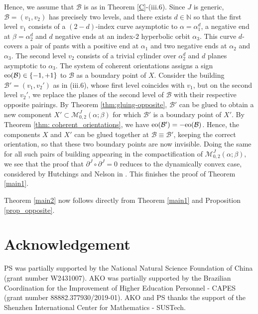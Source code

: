 \documentclass{amsart}
\newcommand{\N}{\mathbb{N}}
\begin{document}
Hence, we assume that $\mathcal B$ is as in Theorem \ref{C}-(iii.6). Since $J$ is generic, $\mathcal B=(v_1,v_2)$ has precisely two levels, and there exists $d\in \N$ so that the first level $v_1$ consists of a $(2-d)$-index curve asymptotic to $\alpha=\alpha_1^d$, a negative end at $\beta=\alpha_2^d$ and $d$ negative ends at an index-$2$ hyperbolic orbit $\alpha_3$. This curve $d$-covers a pair of pants with a positive end at $\alpha_1$ and two negative ends at $\alpha_2$ and $\alpha_3$. The second level $v_2$ consists of a trivial cylinder over $\alpha_2^d$ and $d$ planes asymptotic to $\alpha_3$. The system of coherent orientations assigns a sign ${\rm eo}(\mathcal B) \in \{-1,+1\}$ to $\mathcal B$ as a boundary point of $X$. Consider the building $\mathcal B'=(v_1,v_2')$ as in (iii.6), whose first level coincides with $v_1$, but on the second level $v_2'$, we replace the planes of the second level of $\mathcal B$ with their respective opposite pairings. By Theorem \ref{thm:gluing-opposite}, $\mathcal B'$ can be glued to obtain a new component $X' \subset \mathcal{M}^J_{0,2}(\alpha ; \beta)$ for which $\mathcal B'$ is a boundary point of $X'$. By Theorem \ref{thm: coherent_orientations}, we have ${\rm eo}(\mathcal B') = -{\rm eo}(\mathcal B)$. Hence, the components $X$ and $X'$ can be glued together at $\mathcal B \equiv \mathcal B'$, keeping the correct orientation, so that these two boundary points are now invisible. Doing the same for all such pairs of building appearing in the compactification of $\mathcal{M}^J_{0,2}(\alpha ; \beta),$ we see that the proof that $\partial^J \circ \partial^J =0$ reduces to the dynamically convex case, considered by Hutchings and Nelson in \cite{HN}. This finishes the proof of Theorem \ref{main1}.    

Theorem \ref{main2} now follows directly from Theorem \ref{main1} and Proposition \ref{prop_opposite}.


\section*{Acknowledgement}

 PS was partially supported by the National Natural Science Foundation of China (grant number W2431007). AKO was partially supported by the Brazilian Coordination for the Improvement of Higher Education Personnel - CAPES (grant number 88882.377930/2019-01). AKO and PS thanks the support of the Shenzhen International Center for Mathematics - SUSTech.






\end{document}
